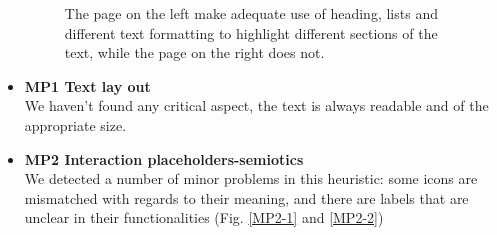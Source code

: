 \begin{itemize}
        \begin{figure}[!ht]
            \centering
            \qquad
            \caption{The page on the left make adequate use of heading, lists and different text formatting to highlight different sections of the text, while the page on the right does not.}%
            \label{fig:MC1-3}%
        \end{figure}
    \item \textbf{MP1 Text lay out}\\
        We haven't found any critical aspect, the text is always readable and of the appropriate size.\\
    \item \textbf{MP2 Interaction placeholders-semiotics}\\
        We detected a number of minor problems in this heuristic: some icons are mismatched with regards to their meaning, and there are labels that are unclear in their functionalities (Fig. \ref{MP2-1} and \ref{MP2-2})
        \begin{figure}[!ht]
            \begin{minipage}{\linewidth}
                \centering

\end{minipage}
\end{figure}
\end{itemize}
